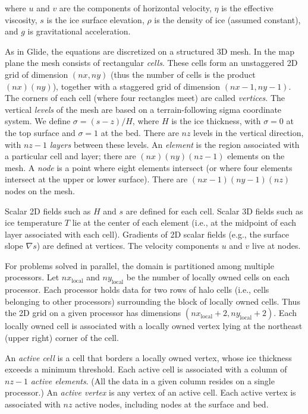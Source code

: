 \noindent
where $u$ and $v$ are the components of horizontal velocity, $\eta$ is the effective viscosity, $s$ is the ice surface elevation,
$\rho$ is the density of ice (assumed constant), and $g$ is gravitational acceleration.  

As in Glide, the equations are discretized on a structured 3D mesh.
In the map plane the mesh consists of rectangular \textit{cells}. These cells form an unstaggered 2D grid 
of dimension $(nx,ny)$ (thus the number of cells is the product $(nx)(ny)$), together with a staggered grid of dimension $(nx-1,ny-1)$.
The corners of each cell (where four rectangles meet) are called \textit{vertices}.
The vertical \textit{levels} of the mesh are based on a terrain-following sigma coordinate system. 
We define $\sigma = (s-z)/H$, where $H$ is the ice thickness, with $\sigma = 0$ at the top surface and $\sigma = 1$ at the bed. 
There are $nz$ levels in the vertical direction, with $nz-1$ \textit{layers} between these levels.
An \textit{element} is the region associated with a particular cell and layer; there are
$(nx)(ny)(nz-1)$ elements on the mesh.  A \textit{node} is a point where eight elements intersect (or where four elements
intersect at the upper or lower surface). There are $(nx-1)(ny-1)(nz)$ nodes on the mesh.

Scalar 2D fields such as $H$ and $s$ are defined for each cell.
Scalar 3D fields such as ice temperature $T$ lie at the center of each element (i.e., at the midpoint of each layer
associated with  each cell). Gradients of 2D scalar fields (e.g., the surface slope $\nabla s$) are defined at vertices.
The velocity components $u$ and $v$ live at nodes.

For problems solved in parallel, the domain is partitioned among multiple processors.  
Let $nx_{\textrm{local}}$ and $ny_\textrm{{local}}$ be the
number of locally owned cells on each processor.  Each processor holds data for two rows of halo cells 
(i.e., cells belonging to other processors) surrounding the block of locally owned cells.
Thus the 2D grid on a given processor has dimensions $(nx_{\textrm{local}} + 2, ny_{\textrm{local}} + 2)$.
Each locally owned cell is associated with a locally owned vertex lying at the northeast (upper right) corner
of the cell.

An \textit{active cell} is a cell that borders a locally owned vertex, whose ice thickness exceeds a minimum threshold.  
Each active cell is associated with a column of $nz-1$ \textit{active elements}.  
(All the data in a given column resides on a single processor.)
An \textit{active vertex} is any vertex of an active cell.  Each active vertex is
associated with $nz$ active nodes, including nodes at the surface and bed.

